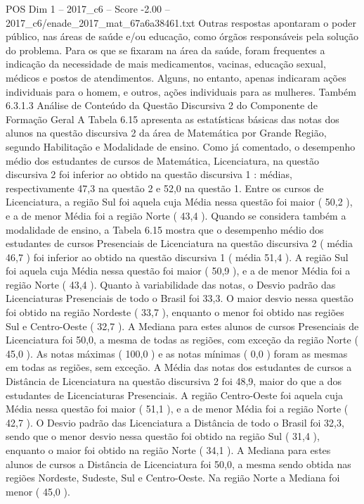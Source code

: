 \begin{textsample}{POS Dim 1 – 2017\_c6 – Score -2.00 – 2017\_c6/enade\_2017\_mat\_67a6a38461.txt}
Outras respostas apontaram o poder público, nas áreas de saúde e/ou educação, como órgãos responsáveis pela solução do problema.
Para os que se fixaram na área da saúde, foram frequentes a indicação da necessidade de mais medicamentos, vacinas, educação sexual, médicos e postos de atendimentos.
Alguns, no entanto, apenas indicaram ações individuais para o homem, e outros, ações individuais para as mulheres.
Também 6.3.1.3 Análise de Conteúdo da Questão Discursiva 2 do Componente de Formação Geral A Tabela 6.15 apresenta as estatísticas básicas das notas dos alunos na questão discursiva 2 da área de Matemática por Grande Região, segundo Habilitação e Modalidade de ensino.
Como já comentado, o desempenho médio dos estudantes de cursos de Matemática, Licenciatura, na questão discursiva 2 foi inferior ao obtido na questão discursiva 1 : médias, respectivamente 47,3 na questão 2 e 52,0 na questão 1.
Entre os cursos de Licenciatura, a região Sul foi aquela cuja Média nessa questão foi maior ( 50,2 ), e a de menor Média foi a região Norte ( 43,4 ).
Quando se considera também a modalidade de ensino, a Tabela 6.15 mostra que o desempenho médio dos estudantes de cursos Presenciais de Licenciatura na questão discursiva 2 ( média 46,7 ) foi inferior ao obtido na questão discursiva 1 ( média 51,4 ).
A região Sul foi aquela cuja Média nessa questão foi maior ( 50,9 ), e a de menor Média foi a região Norte ( 43,4 ).
Quanto à variabilidade das notas, o Desvio padrão das Licenciaturas Presenciais de todo o Brasil foi 33,3.
O maior desvio nessa questão foi obtido na região Nordeste ( 33,7 ), enquanto o menor foi obtido nas regiões Sul e Centro-Oeste ( 32,7 ).
A Mediana para estes alunos de cursos Presenciais de Licenciatura foi 50,0, a mesma de todas as regiões, com exceção da região Norte ( 45,0 ).
As notas máximas ( 100,0 ) e as notas mínimas ( 0,0 ) foram as mesmas em todas as regiões, sem exceção.
A Média das notas dos estudantes de cursos a Distância de Licenciatura na questão discursiva 2 foi 48,9, maior do que a dos estudantes de Licenciaturas Presenciais.
A região Centro-Oeste foi aquela cuja Média nessa questão foi maior ( 51,1 ), e a de menor Média foi a região Norte ( 42,7 ).
O Desvio padrão das Licenciatura a Distância de todo o Brasil foi 32,3, sendo que o menor desvio nessa questão foi obtido na região Sul ( 31,4 ), enquanto o maior foi obtido na região Norte ( 34,1 ).
A Mediana para estes alunos de cursos a Distância de Licenciatura foi 50,0, a mesma sendo obtida nas regiões Nordeste, Sudeste, Sul e Centro-Oeste.
Na região Norte a Mediana foi menor ( 45,0 ).

\end{textsample}
